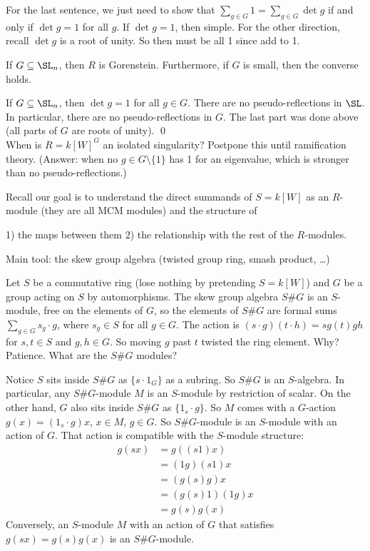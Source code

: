 For the last sentence, we just need to show that $\sum_{g \in G} 1 = \sum_{g \in G} \det g$ if and only if $\det g=1$ for all $g$. If $\det g=1$, then simple. For the other direction, recall $\det g$ is a root of unity. So then must be all 1 since add to 1. 






\begin{cor}[Watanabe]
If $G \subseteq \SL_n$, then $R$ is Gorenstein. Furthermore, if $G$ is small, then the converse holds.
\end{cor}

\pf If $G \subseteq \SL_n$, then $\det g=1$ for all $g \in G$. There are no pseudo-reflections in $\SL$. In particular, there are no pseudo-reflections in $G$. The last part was done above (all parts of $G$ are roots of unity). \qed \\



When is $R= k[W]^G$ an isolated singularity? Postpone this until ramification theory. (Answer: when no $g \in G \setminus \{1\}$ has 1 for an eigenvalue, which is stronger than no pseudo-reflections.)


Recall our goal is to understand the direct summands of $S= k[W]$ as an $R$-module (they are all MCM modules) and the structure of

1) the maps between them
2) the relationship with the rest of the $R$-modules.

Main tool: the skew group algebra (twisted group ring, smash product, \dots)

Let $S$ be a commutative ring (lose nothing by pretending $S= k[W]$) and $G$ be a group acting on $S$ by automorphisms. The skew group algebra $S\#G$ is an $S$-module, free on the elements of $G$, so the elements of $S\#G$ are formal sums $\sum_{g \in G} s_g \cdot g$, where $s_g \in S$ for all $g \in G$. The action is $(s \cdot g)(t\cdot h)= sg(t)gh$ for $s,t \in S$ and $g,h \in G$. So moving $g$ past $t$ twisted the ring element. Why? Patience. What are the $S\#G$ modules?


Notice $S$ sits inside $S\#G$ as $\{s \cdot 1_G\}$ as a subring. So $S\#G$ is an $S$-algebra. In particular, any $S\#G$-module $M$ is an $S$-module by restriction of scalar. On the other hand, $G$ also sits inside $S\#G$ as $\{1_s \cdot g\}$. So $M$ comes with a $G$-action $g(x)= (1_s \cdot g)x$, $x \in M$, $g \in G$. So $S\#G$-module is an $S$-module with an action of $G$. That action is compatible with the $S$-module structure: 
	\[
	\begin{split}
	g(sx)&= g((s1)x) \\
	&= (1g)(s1)x \\
	&= (g(s)g)x \\
	&=(g(s)1)(1g)x \\
	&= g(s)g(x)
	\end{split}
	\]
Conversely, an $S$-module $M$ with an action of $G$ that satisfies $g(sx)=g(s)g(x)$ is an $S\#G$-module.

